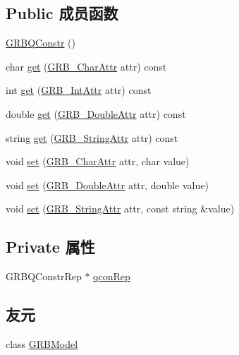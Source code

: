 \subsection*{Public 成员函数}
\begin{DoxyCompactItemize}
\item 
\hyperlink{classGRBQConstr_a7652dd54e0b724d5701267939a42b9ab}{G\+R\+B\+Q\+Constr} ()
\item 
char \hyperlink{classGRBQConstr_a874b933d3948378d5d82b8b4aef7e31b}{get} (\hyperlink{gurobi__c_09_09_8h_a590e6aa44289cb0563eb6a382794dace}{G\+R\+B\+\_\+\+Char\+Attr} attr) const 
\item 
int \hyperlink{classGRBQConstr_af5e18b8367c22f3d99fdee3ff99d2b23}{get} (\hyperlink{gurobi__c_09_09_8h_acfc136f6822be3d3e36ac84bd76b0900}{G\+R\+B\+\_\+\+Int\+Attr} attr) const 
\item 
double \hyperlink{classGRBQConstr_a0becdaa6287d54e8eaf063ab20409792}{get} (\hyperlink{gurobi__c_09_09_8h_a2f43cc28447ce1778973a1f7961e8180}{G\+R\+B\+\_\+\+Double\+Attr} attr) const 
\item 
string \hyperlink{classGRBQConstr_a9829a0c14ff221d5e530ff87e149e666}{get} (\hyperlink{gurobi__c_09_09_8h_a08ffa110d9b1684d689ae53300bb7ec1}{G\+R\+B\+\_\+\+String\+Attr} attr) const 
\item 
void \hyperlink{classGRBQConstr_a9b0ce1d418b0792b2e8b94c101ff042b}{set} (\hyperlink{gurobi__c_09_09_8h_a590e6aa44289cb0563eb6a382794dace}{G\+R\+B\+\_\+\+Char\+Attr} attr, char value)
\item 
void \hyperlink{classGRBQConstr_a7ced889984631fd85c2f3f96e2b92ca0}{set} (\hyperlink{gurobi__c_09_09_8h_a2f43cc28447ce1778973a1f7961e8180}{G\+R\+B\+\_\+\+Double\+Attr} attr, double value)
\item 
void \hyperlink{classGRBQConstr_a987d08314ec7bc9ce28ff7450696436f}{set} (\hyperlink{gurobi__c_09_09_8h_a08ffa110d9b1684d689ae53300bb7ec1}{G\+R\+B\+\_\+\+String\+Attr} attr, const string \&value)
\end{DoxyCompactItemize}
\subsection*{Private 属性}
\begin{DoxyCompactItemize}
\item 
G\+R\+B\+Q\+Constr\+Rep $\ast$ \hyperlink{classGRBQConstr_a6902b113e59d87057004deca9c0c87b9}{qcon\+Rep}
\end{DoxyCompactItemize}
\subsection*{友元}
\begin{DoxyCompactItemize}
\item 
class \hyperlink{classGRBQConstr_a43690ac42cca6dade14d7fde97306d59}{G\+R\+B\+Model}
\end{DoxyCompactItemize}


